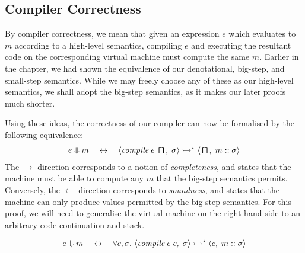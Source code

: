 
\subsection{Compiler Correctness}%

By compiler correctness, we mean that given an expression $e$ which
evaluates to $m$ according to a high-level semantics, compiling $e$ and
executing the resultant code on the corresponding virtual machine must
compute the same $m$. Earlier in the chapter, we had shown the equivalence
of our denotational, big-step, and small-step semantics. While we may freely
choose any of these as our high-level semantics, we shall adopt the big-step
semantics, as it makes our later proofs much shorter.

Using these ideas, the correctness of our compiler can now be formalised by
the following equivalence:
\begin{gather*}
	e \Eval m
	\quad\leftrightarrow\quad
	\MS<\compile\;e\;\nil, \sigma>
		\ExecS \MS<\nil, m :: \sigma>
\end{gather*}
The $\rightarrow$ direction corresponds to a notion of \emph{completeness},
and states that the machine must be able to compute any $m$ that the
big-step semantics permits. Conversely, the $\leftarrow$ direction
corresponds to \emph{soundness}, and states that the machine can only
produce values permitted by the big-step semantics. For this proof, we will
need to generalise the virtual machine on the right hand side to an
arbitrary code continuation and stack.
\begin{theorem}\label{thm:compiler-correct}
\begin{gather*}
	e \Eval m
	\quad\leftrightarrow\quad
	\forall c, \sigma.\
		\MS<\compile\;e\;c, \sigma>
			\ExecS \MS<c, m :: \sigma>
\end{gather*}
\end{theorem}

